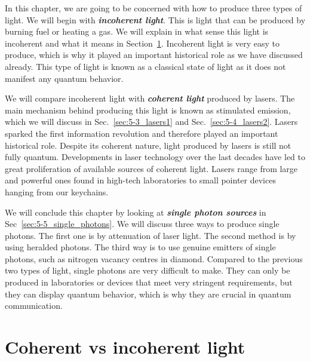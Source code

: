 In this chapter, we are going to be concerned with how to produce three types of light.
We will begin with \textit{\textbf{incoherent light}}.
This is light that can be produced by burning fuel or heating a gas.
We will explain in what sense this light is incoherent and what it means in Section~\ref{sec:5-2_coherent_vs_incoherent}.
Incoherent light is very easy to produce, which is why it played an important historical role as we have discussed already.
This type of light is known as a classical state of light as it does not manifest any quantum behavior.

We will compare incoherent light with \textit{\textbf{coherent light}} produced by lasers. The main mechanism behind producing this light is known as stimulated emission, which we will discuss in Sec.~\ref{sec:5-3_lasers1} and Sec.~\ref{sec:5-4_lasers2}.
Lasers sparked the first information revolution and therefore played an important historical role.
Despite its coherent nature, light produced by lasers is still not fully quantum. 
Developments in laser technology over the last decades have led to great proliferation of available sources of coherent light.
Lasers range from large and powerful ones found in high-tech laboratories to small pointer devices hanging from our keychains.

We will conclude this chapter by looking at \textit{\textbf{single photon sources}} in Sec~\ref{sec:5-5_single_photons}.
We will discuss three ways to produce single photons.
The first one is by attenuation of laser light.
The second method is by using heralded photons.
The third way is to use genuine emitters of single photons, such as nitrogen vacancy centres in diamond.
Compared to the previous two types of light, single photons are very difficult to make.
They can only be produced in laboratories or devices that meet very stringent requirements, but they can display quantum behavior, which is why they are crucial in quantum communication.


\section{Coherent vs incoherent light}
\label{sec:5-2_coherent_vs_incoherent}

